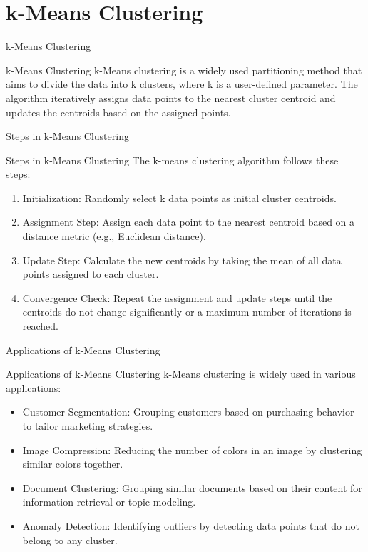 \documentclass[hyperref={pdfpagelabels=false},aspectratio=169]{beamer}
\begin{document}
\section[k-Means]{k-Means Clustering}
\label{sec:org4b1558e}
\begin{frame}[label={sec:orgbcce641}]{k-Means Clustering}
\begin{block}{k-Means Clustering}
\pause
\alert{k-Means clustering} is a widely used partitioning method that aims to divide the data into k clusters, where k is a user-defined parameter. The algorithm iteratively assigns data points to the nearest cluster centroid and updates the centroids based on the assigned points.
\end{block}
\end{frame}
\begin{frame}[label={sec:orge3cb80b}]{Steps in k-Means Clustering}
\begin{block}{Steps in k-Means Clustering}
\pause
The k-means clustering algorithm follows these steps:
\begin{enumerate}[<+->]
\item \alert{\alert{Initialization}}: Randomly select k data points as initial cluster centroids.
\item \alert{\alert{Assignment Step}}: Assign each data point to the nearest centroid based on a distance metric (e.g., Euclidean distance).
\item \alert{\alert{Update Step}}: Calculate the new centroids by taking the mean of all data points assigned to each cluster.
\item \alert{\alert{Convergence Check}}: Repeat the assignment and update steps until the centroids do not change significantly or a maximum number of iterations is reached.
\end{enumerate}
\end{block}
\end{frame}
\begin{frame}[label={sec:org4739bd4}]{Applications of k-Means Clustering}
\begin{block}{Applications of k-Means Clustering}
\pause
k-Means clustering is widely used in various applications:
\begin{itemize}[<+->]
\item \alert{\alert{Customer Segmentation}}: Grouping customers based on purchasing behavior to tailor marketing strategies.
\item \alert{\alert{Image Compression}}: Reducing the number of colors in an image by clustering similar colors together.
\item \alert{\alert{Document Clustering}}: Grouping similar documents based on their content for information retrieval or topic modeling.
\item \alert{\alert{Anomaly Detection}}: Identifying outliers by detecting data points that do not belong to any cluster.
\end{itemize}
\end{block}
\end{frame}
\end{document}
